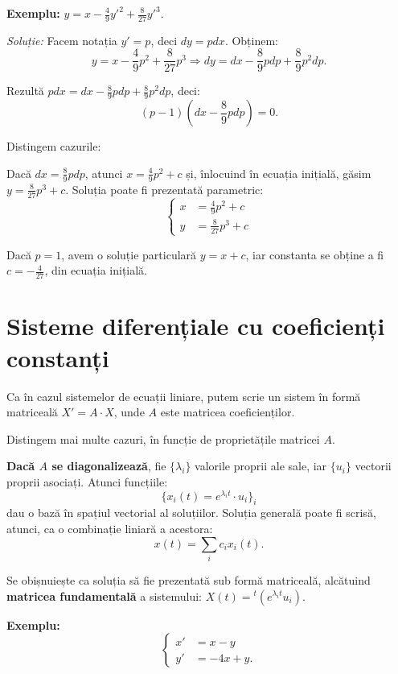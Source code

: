 \documentclass[11pt,a4paper]{article}
\theoremstyle{dotless}
\theoremstyle{dotlessdr}
\begin{document}
\textbf{Exemplu:} $y = x - \frac{4}{9} {y'}^2 + \frac{8}{27} {y'}^3$.

\emph{Soluție:} Facem notația $y' = p$, deci $dy = pdx$. Obținem:
\[
  y = x - \frac{4}{9} p^2 + \frac{8}{27} p^3 \Rightarrow %
  dy = dx - \frac{8}{9} pdp + \frac{8}{9} p^2 dp.
\]

Rezultă $pdx = dx - \frac{8}{9} pdp + \frac{8}{9} p^2 dp$, deci:
\[
  (p - 1)(dx - \frac{8}{9} pdp) = 0.
\]

Distingem cazurile:

Dacă $dx = \frac{8}{9} pdp$, atunci $x = \frac{4}{9} p^2 + c$ și, înlocuind în
ecuația inițială, găsim $y = \frac{8}{27} p^3 + c$. Soluția poate fi prezentată parametric:
\[
  \begin{cases}
    x &= \frac{4}{9} p^2 + c \\
    y &= \frac{8}{27} p^3 + c
  \end{cases}
\]

Dacă $p = 1$, avem o soluție particulară $y = x + c$, iar constanta se obține a fi $c = -\frac{4}{27}$,
din ecuația inițială.


\section{Sisteme diferențiale cu coeficienți constanți}
\label{sec:sist-ct}

Ca în cazul sistemelor de ecuații liniare, putem scrie un sistem în formă matriceală $X' = A \cdot X$,
unde $A$ este matricea coeficienților.

Distingem mai multe cazuri, în funcție de proprietățile matricei $A$.

\textbf{Dacă $A$ se diagonalizează}, fie $\{\lambda_i\}$ valorile proprii ale sale,
iar $\{u_i\}$ vectorii proprii asociați. Atunci funcțiile:
\[
  \{ x_i(t) = e^{\lambda_i t} \cdot u_i \}_i
\]
dau o bază în spațiul vectorial al soluțiilor. Soluția generală poate fi scrisă,
atunci, ca o combinație liniară a acestora:
\[
  x(t) = \sum_i c_i x_i(t).
\]

Se obișnuiește ca soluția să fie prezentată sub formă matriceală, alcătuind
\textbf{matricea fundamentală} a sistemului: $X(t) = {}^t (e^{\lambda_i t} u_i)$.

\vspace{1cm}

\textbf{Exemplu:}
\[
  \begin{cases}
    x' &= x - y \\
    y' &= -4x + y.
  \end{cases}
\]
\end{document}

